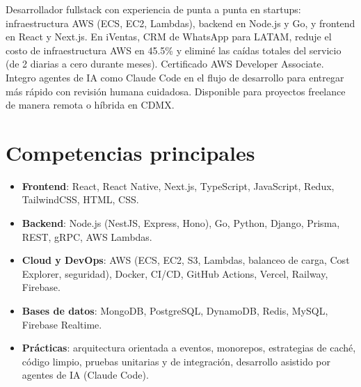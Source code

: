 \documentclass[11pt,a4paper,sans]{moderncv}
\begin{document}
\makecvtitle


\vspace{6pt}
\small{Desarrollador fullstack con experiencia de punta a punta en startups: infraestructura AWS (ECS, EC2, Lambdas), backend en Node.js y Go, y frontend en React y Next.js. En iVentas, CRM de WhatsApp para LATAM, reduje el costo de infraestructura AWS en 45.5\% y eliminé las caídas totales del servicio (de 2 diarias a cero durante meses). Certificado AWS Developer Associate. Integro agentes de IA como Claude Code en el flujo de desarrollo para entregar más rápido con revisión humana cuidadosa. Disponible para proyectos freelance de manera remota o híbrida en CDMX.}


\section{Competencias principales}
\vspace{1pt}
\begin{itemize}

\item \textbf{Frontend}: React, React Native, Next.js, TypeScript, JavaScript, Redux, TailwindCSS, HTML, CSS.

\item \textbf{Backend}: Node.js (NestJS, Express, Hono), Go, Python, Django, Prisma, REST, gRPC, AWS Lambdas.

\item \textbf{Cloud y DevOps}: AWS (ECS, EC2, S3, Lambdas, balanceo de carga, Cost Explorer, seguridad), Docker, CI/CD, GitHub Actions, Vercel, Railway, Firebase.

\item \textbf{Bases de datos}: MongoDB, PostgreSQL, DynamoDB, Redis, MySQL, Firebase Realtime.

\item \textbf{Prácticas}: arquitectura orientada a eventos, monorepos, estrategias de caché, código limpio, pruebas unitarias y de integración, desarrollo asistido por agentes de IA (Claude Code).

\end{itemize}
\end{document}

